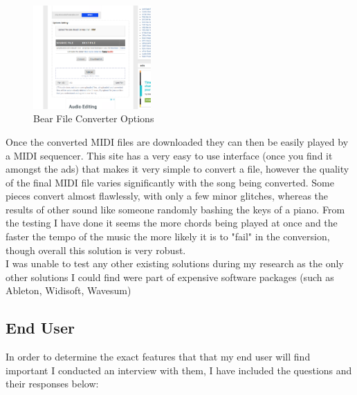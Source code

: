 \documentclass[12pt]{report}
\begin{document}
\begin{figure}[H]
	\centering
	\includegraphics[width=0.4\textwidth]{site2.PNG}
	\caption{Bear File Converter Options}
	\centering
	\label{label:bear_site2}
\end{figure}

Once the converted MIDI files are downloaded they can then be easily played by a MIDI sequencer. This site has a very easy to use interface (once you find it amongst the ads) that makes it very simple to convert a file, however the quality of the final MIDI file varies significantly with the song being converted. Some pieces convert almost flawlessly, with only a few minor glitches, whereas the results of other sound like someone randomly bashing the keys of a piano. From the testing I have done it seems the more chords being played at once and the faster the tempo of the music the more likely it is to "fail" in the conversion, though overall this solution is very robust.\\

I was unable to test any other existing solutions during my research as the only other solutions I could find were part of expensive software packages (such as Ableton\cite{Ableton}, Widisoft\cite{Widisoft}, Wavesum\cite{Wavesum})

\subsection*{End User}
In order to determine the exact features that that my end user will find important I conducted an interview with them, I have included the questions and their responses below:
\end{document}
